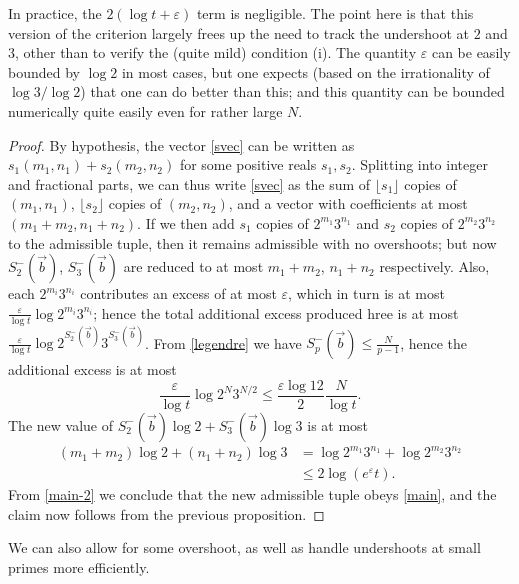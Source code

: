 \documentclass[12pt,a4paper,reqno]{amsart}
\numberwithin{equation}{section}
\theoremstyle{plain}
\theoremstyle{definition}
\newcommand\eps{\varepsilon}
\begin{document}
In practice, the $2(\log t+\eps)$ term is negligible. The point here is that this version of the criterion largely frees up the need to track the undershoot at $2$ and $3$, other than to verify the (quite mild) condition (i).  The quantity $\eps$ can be easily bounded by $\log 2$ in most cases, but one expects (based on the irrationality of $\log 3/\log 2$) that one can do better than this; and this quantity can be bounded numerically quite easily even for rather large $N$.

\begin{proof}  By hypothesis, the vector \eqref{svec} can be written as $s_1 (m_1,n_1) + s_2 (m_2,n_2)$ for some positive reals $s_1,s_2$.  Splitting into integer and fractional parts, we can thus write \eqref{svec} as the sum of $\lfloor s_1 \rfloor$ copies of $(m_1,n_1)$, $\lfloor s_2 \rfloor$ copies of $(m_2,n_2)$, and a vector with coefficients at most $(m_1+m_2, n_1+n_2)$.  If we then add $s_1$ copies of $2^{m_1} 3^{n_1}$ and $s_2$ copies of  $2^{m_2} 3^{n_2}$ to the admissible tuple, then it remains admissible with no overshoots; but now $S^-_2(\vec b)$, $S^-_3(\vec b)$ are reduced to at most $m_1+m_2$, $n_1+n_2$ respectively.  Also, each $2^{m_i} 3^{n_i}$ contributes an excess of at most $\eps$, which in turn is at most $\frac{\eps}{\log t} \log 2^{m_i} 3^{n_i}$; hence the total additional excess produced hree is at most $\frac{\eps}{\log t} \log 2^{S^-_2(\vec b)} 3^{S^-_3(\vec b)}$.  From \eqref{legendre} we have $S^-_p(\vec b) \leq \frac{N}{p-1}$, hence the additional excess is at most
$$ \frac{\eps}{\log t} \log 2^{N} 3^{N/2} \leq \frac{\eps \log 12}{2} \frac{N}{\log t}.$$
The new value of $S^-_2(\vec b) \log 2 + S^-_3(\vec b) \log 3$
is at most
\begin{align*}
  (m_1+m_2) \log 2 + (n_1+n_2)\log 3 &= \log 2^{m_1} 3^{n_1} + \log 2^{m_2} 3^{n_2} \\
  &\leq 2 \log(e^\eps t).
\end{align*}
From \eqref{main-2} we conclude that the new admissible tuple obeys \eqref{main}, and the claim now follows from the previous proposition.  
\end{proof}

We can also allow for some overshoot, as well as handle undershoots at small primes more efficiently.
\end{document}
